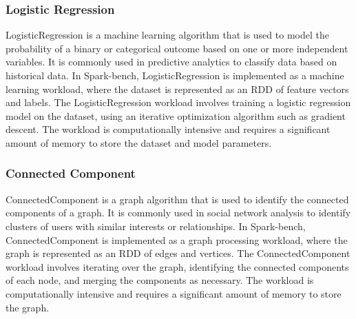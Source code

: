 \subsubsection{Logistic Regression}
LogisticRegression is a machine learning algorithm that is used to
model the probability of a binary or categorical outcome based on one
or more independent variables. It is commonly used in predictive
analytics to classify data based on historical data. In Spark-bench,
LogisticRegression is implemented as a machine learning workload,
where the dataset is represented as an RDD of feature vectors and
labels. The LogisticRegression workload involves training a logistic
regression model on the dataset, using an iterative optimization
algorithm such as gradient descent. The workload is computationally
intensive and requires a significant amount of memory to store the
dataset and model parameters.

\subsubsection{Connected Component}
ConnectedComponent is a graph algorithm that is used to identify the
connected components of a graph. It is commonly used in social network
analysis to identify clusters of users with similar interests or
relationships. In Spark-bench, ConnectedComponent is implemented as a
graph processing workload, where the graph is represented as an RDD of
edges and vertices. The ConnectedComponent workload involves iterating
over the graph, identifying the connected components of each node, and
merging the components as necessary. The workload is computationally
intensive and requires a significant amount of memory to store the
graph.

